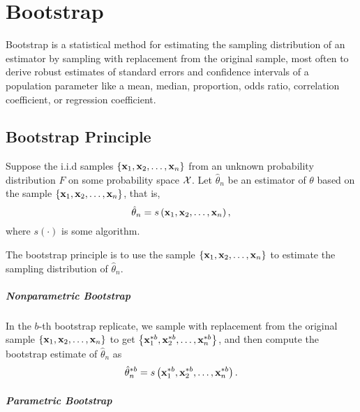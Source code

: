 \chapter{Bootstrap}

Bootstrap is a statistical method for estimating the sampling distribution of an estimator by sampling with replacement from the original sample, most often to derive robust estimates of standard errors and confidence intervals of a population parameter like a mean, median, proportion, odds ratio, correlation coefficient, or regression coefficient.

\section{Bootstrap Principle}

Suppose the i.i.d samples \(\left\{\mathbf{x}_{1},\mathbf{x}_{2},\ldots,\mathbf{x}_{n}\right\}\) from an unknown probability distribution \(F\) on some probability space \(\mathcal{X}\). Let \(\hat{\theta}_{n}\) be an estimator of \(\theta\) based on the sample \(\left\{\mathbf{x}_{1},\mathbf{x}_{2},\ldots,\mathbf{x}_{n}\right\}\), that is,
\begin{equation*}
	\hat{\theta}_{n}=s\left(\mathbf{x}_{1},\mathbf{x}_{2},\ldots,\mathbf{x}_{n}\right),
\end{equation*}
where \(s(\cdot)\) is some algorithm.

The bootstrap principle is to use the sample \(\left\{\mathbf{x}_{1},\mathbf{x}_{2},\ldots,\mathbf{x}_{n}\right\}\) to estimate the sampling distribution of \(\hat{\theta}_{n}\).

\paragraph{Nonparametric Bootstrap}

In the \(b\)-th bootstrap replicate, we sample with replacement from the original sample \(\left\{\mathbf{x}_{1},\mathbf{x}_{2},\ldots,\mathbf{x}_{n}\right\}\) to get \(\left\{\mathbf{x}_{1}^{*b},\mathbf{x}_{2}^{*b},\ldots,\mathbf{x}_{n}^{*b}\right\}\), and then compute the bootstrap estimate of \(\hat{\theta}_{n}\) as
\begin{equation}
	\hat{\theta}_{n}^{*b}=s\left(\mathbf{x}_{1}^{*b},\mathbf{x}_{2}^{*b},\ldots,\mathbf{x}_{n}^{*b}\right).
\end{equation}

\paragraph{Parametric Bootstrap}

